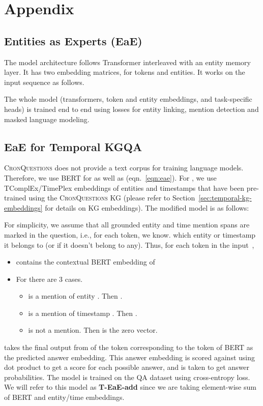 \documentclass[11pt,a4paper]{article}
\newcommand{\dataset}{\textsc{CronQuestions}}
\begin{document}
\appendix

\section{Appendix}













\subsection{Entities as Experts (EaE)}
\label{sec:eae_appendix}
 The model architecture follows Transformer \citep{vaswani2017attention}  interleaved with an entity memory layer. It has two embedding matrices, for tokens and entities.  It works on the input sequence  as follows.

The whole model (transformers, token and entity embeddings, and task-specific heads) is trained end to end using losses for entity linking, mention detection and masked language modeling.

\subsection{EaE for Temporal KGQA}
\dataset{} does not provide a text corpus for training language models.  Therefore, we use BERT \citep{devlin2019bert} for  as well as  (eqn.~\ref{eqn:eae}). For , we use TComplEx/TimePlex embeddings of entities and timestamps that have been pre-trained using the \dataset{} KG (please refer to Section~\ref{sec:temporal-kg-embeddings} for details on KG embeddings). The modified model is as follows:

For simplicity, we assume that all grounded entity and time mention spans are marked in the question, i.e., for each token, we know. which entity or timestamp it belongs to (or if it doesn't belong to any).  Thus, for each token  in the input~, 
\begin{itemize}
    \item  contains the contextual BERT embedding of~
    \item For  there are 3 cases. 
    \begin{itemize}
        \item  is a mention of entity . Then .
        \item  is a mention of timestamp . Then .
        \item  is not a mention. Then  is the zero vector.
    \end{itemize}
\end{itemize}
 takes the final output from  of the token corresponding to the  token of BERT as the predicted answer embedding. This answer embedding is scored against  using dot product to get a score for each possible answer, and  is taken to get answer probabilities. The model is trained on the QA dataset using cross-entropy loss. We will refer to this model as \textbf{T-EaE-add} since we are taking element-wise sum of BERT and entity/time embeddings.
\end{document}
